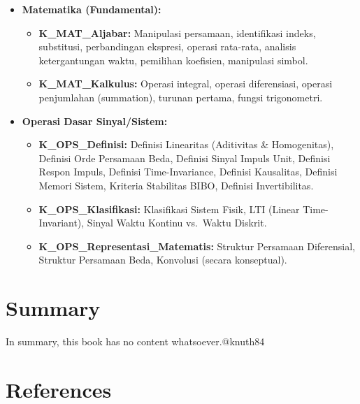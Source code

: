 \documentclass[
  letterpaper,
  DIV=11,
  numbers=noendperiod]{scrreprt}
\providecommand{\tightlist}{%
  \setlength{\itemsep}{0pt}\setlength{\parskip}{0pt}}
\begin{document}
\begin{itemize}
\tightlist
\item
  \textbf{Matematika (Fundamental):}

  \begin{itemize}
  \tightlist
  \item
    \textbf{K\_MAT\_Aljabar:} Manipulasi persamaan, identifikasi indeks,
    substitusi, perbandingan ekspresi, operasi rata-rata, analisis
    ketergantungan waktu, pemilihan koefisien, manipulasi simbol.
  \item
    \textbf{K\_MAT\_Kalkulus:} Operasi integral, operasi diferensiasi,
    operasi penjumlahan (summation), turunan pertama, fungsi
    trigonometri.
  \end{itemize}
\item
  \textbf{Operasi Dasar Sinyal/Sistem:}

  \begin{itemize}
  \tightlist
  \item
    \textbf{K\_OPS\_Definisi:} Definisi Linearitas (Aditivitas \&
    Homogenitas), Definisi Orde Persamaan Beda, Definisi Sinyal Impuls
    Unit, Definisi Respon Impuls, Definisi Time-Invariance, Definisi
    Kausalitas, Definisi Memori Sistem, Kriteria Stabilitas BIBO,
    Definisi Invertibilitas.
  \item
    \textbf{K\_OPS\_Klasifikasi:} Klasifikasi Sistem Fisik, LTI (Linear
    Time-Invariant), Sinyal Waktu Kontinu vs.~Waktu Diskrit.
  \item
    \textbf{K\_OPS\_Representasi\_Matematis:} Struktur Persamaan
    Diferensial, Struktur Persamaan Beda, Konvolusi (secara konseptual).
  \end{itemize}
\end{itemize}


\chapter{Summary}\label{summary}

In summary, this book has no content whatsoever.@knuth84


\chapter*{References}\label{references}


\label{refs}
\end{document}
